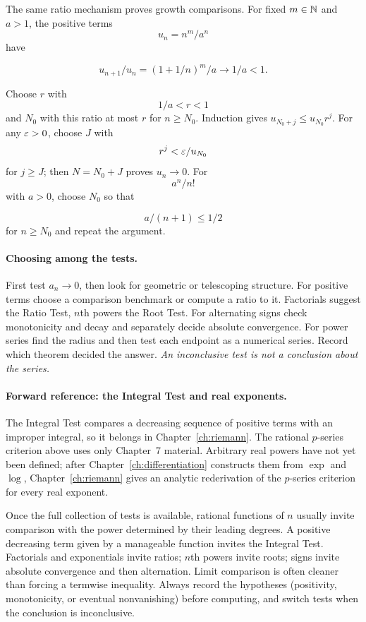 The same ratio mechanism proves growth comparisons. For fixed
$m\in\mathbb{N}$ and $a>1$, the positive terms
\[
u_n=n^m/a^n
\]
 have

\[
u_{n+1}/u_n=(1+1/n)^m/a\to1/a<1.
\]

Choose $r$ with
\[
1/a<r<1
\]
 and $N_0$ with this ratio at most $r$
for $n\geq N_0$. Induction gives $u_{N_0+j}\leq u_{N_0}r^j$.
For any $\varepsilon>0$, choose $J$ with
\[
r^j<\varepsilon/u_{N_0}
\]
 for
$j\geq J$; then $N=N_0+J$ proves $u_n\to0$.
For
\[
a^n/n!
\]
 with $a>0$, choose $N_0$ so that

\[
a/(n+1)\leq1/2
\]
 for $n\geq N_0$ and repeat the argument.

\paragraph{Choosing among the tests.}
First test $a_n\to0$, then look for geometric or telescoping structure.
For positive terms choose a comparison benchmark or compute a ratio to
it. Factorials suggest the Ratio Test, $n$th powers the Root Test.
For alternating signs check monotonicity and decay and separately decide
absolute convergence. For power series find the radius and then test
each endpoint as a numerical series. Record which theorem decided the
answer. \emph{An inconclusive test is not a conclusion about the series.}

\paragraph{Forward reference: the Integral Test and real exponents.}
The Integral Test compares a decreasing sequence of positive terms with an improper integral, so it belongs in Chapter~\ref{ch:riemann}. The rational $p$-series criterion above uses only Chapter~7 material. Arbitrary real powers have not yet been defined; after Chapter~\ref{ch:differentiation} constructs them from $\exp$ and $\log$, Chapter~\ref{ch:riemann} gives an analytic rederivation of the $p$-series criterion for every real exponent.

\begin{remark}
Once the full collection of tests is available, rational functions of $n$ usually invite
comparison with the power determined by their leading degrees.  A positive
decreasing term given by a manageable function invites the Integral Test.
Factorials and exponentials invite ratios; $n$th powers invite roots; signs
invite absolute convergence and then alternation.  Limit comparison is often
cleaner than forcing a termwise inequality.  Always record the hypotheses
(positivity, monotonicity, or eventual nonvanishing) before computing, and
switch tests when the conclusion is inconclusive.
\end{remark}

